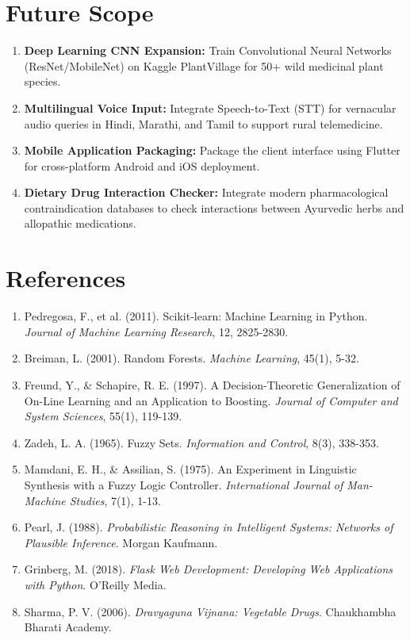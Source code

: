 \documentclass[12pt,a4paper]{article}
\begin{document}
\section{Future Scope}

\begin{enumerate}
    \item \textbf{Deep Learning CNN Expansion:} Train Convolutional Neural Networks (ResNet/MobileNet) on Kaggle PlantVillage for 50+ wild medicinal plant species.
    \item \textbf{Multilingual Voice Input:} Integrate Speech-to-Text (STT) for vernacular audio queries in Hindi, Marathi, and Tamil to support rural telemedicine.
    \item \textbf{Mobile Application Packaging:} Package the client interface using Flutter for cross-platform Android and iOS deployment.
    \item \textbf{Dietary Drug Interaction Checker:} Integrate modern pharmacological contraindication databases to check interactions between Ayurvedic herbs and allopathic medications.
\end{enumerate}

\section{References}

\begin{enumerate}
    \item Pedregosa, F., et al. (2011). Scikit-learn: Machine Learning in Python. \textit{Journal of Machine Learning Research}, 12, 2825-2830.
    \item Breiman, L. (2001). Random Forests. \textit{Machine Learning}, 45(1), 5-32.
    \item Freund, Y., \& Schapire, R. E. (1997). A Decision-Theoretic Generalization of On-Line Learning and an Application to Boosting. \textit{Journal of Computer and System Sciences}, 55(1), 119-139.
    \item Zadeh, L. A. (1965). Fuzzy Sets. \textit{Information and Control}, 8(3), 338-353.
    \item Mamdani, E. H., \& Assilian, S. (1975). An Experiment in Linguistic Synthesis with a Fuzzy Logic Controller. \textit{International Journal of Man-Machine Studies}, 7(1), 1-13.
    \item Pearl, J. (1988). \textit{Probabilistic Reasoning in Intelligent Systems: Networks of Plausible Inference}. Morgan Kaufmann.
    \item Grinberg, M. (2018). \textit{Flask Web Development: Developing Web Applications with Python}. O'Reilly Media.
    \item Sharma, P. V. (2006). \textit{Dravyaguna Vijnana: Vegetable Drugs}. Chaukhambha Bharati Academy.
\end{enumerate}
\end{document}
